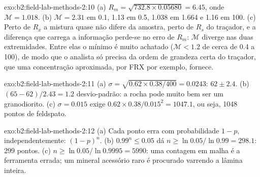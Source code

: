 \begin{solution}{exo:b2:field-lab-methods-2:10}
(a) $R_m = \sqrt{732.8 \times 0.05680} = 6.45$, onde $\mathcal M = 1.018$. (b) $\mathcal M = 2.31$
em 0.1, 1.13 em 0.5, 1.038 em 1.664 e 1.16 em 100. (c) Perto de $R_x$ a mistura quase não difere
da amostra, perto de $R_s$ do traçador, e a diferença que carrega a informação perde-se no
erro de $R_m$: $\mathcal M$ diverge nas duas extremidades. Entre elas o mínimo é muito achatado
($\mathcal M < 1.2$ de cerca de 0.4 a 100), de modo que o analista só precisa da ordem de grandeza certa
do traçador, que uma concentração aproximada, por FRX por exemplo, fornece.
\end{solution}

\begin{solution}{exo:b2:field-lab-methods-2:11}
(a) $\sigma = \sqrt{0.62 \times 0.38/400} = 0.0243$: $62 \pm 2.4$. (b) $(65 - 62)/2.43 = 1.2$
desvio-padrão: a rocha pode muito bem ser um granodiorito. (c) $\sigma = 0.015$ exige $0.62 \times
0.38/0.015^2 = 1047.1$, ou seja, 1048 pontos de feldspato.
\end{solution}

\begin{solution}{exo:b2:field-lab-methods-2:12}
(a) Cada ponto erra com probabilidade $1 - p$, independentemente: $(1-p)^n$. (b) $0.99^n \le 0.05$
dá $n \ge \ln 0.05/\ln 0.99 = 298.1$: 299 pontos. (c) $n \ge \ln 0.05/\ln 0.9995 = 5990$: uma contagem em malha
é a ferramenta errada; um mineral acessório raro é procurado varrendo a lâmina inteira.
\end{solution}

